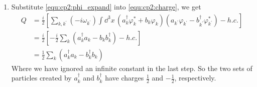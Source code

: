 \begin{enumerate}[label = {(\alph*)}]
    \item Substitute \eqref{equ:cp2:phi_expand} into \eqref{equ:cp2:charge}, we get
    \begin{align}\label{equ:cp2:charge_diag}
        Q & = \frac{i}{2} \left[\sum_{k, k^\prime} (-i\omega_{k^\prime})
        \int \dd^3x \, \left(a^\dagger_k\varphi^\ast_k + b_k\varphi_k\right)
        \left(a_{k^\prime} \varphi_{k^\prime} - b^\dagger_{k^\prime}\varphi^\ast_{k^\prime}\right) - h.c.\right]\nonumber\\
        & = \frac{i}{2} \left[-\frac{i}{2} \sum_k \left(a^\dagger_k a_k - b_k b^\dagger_k\right) - h.c.\right]\nonumber\\
        & = \frac{1}{2} \sum_k \left(a^\dagger_k a_k - b^\dagger_k b_k\right)
    \end{align}
    Where we have ignored an infinite constant in the last step. So the two sets of particles created by $a^\dagger_k$ and $b^\dagger_k$ have charges
    $\frac{1}{2}$ and $-\frac{1}{2}$, respectively.


\end{enumerate}
